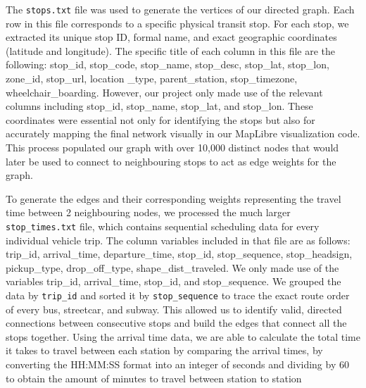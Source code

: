 \documentclass[fontsize=11pt]{article}
\begin{document}
\vspace{1em}

The \texttt{stops.txt} file was used to generate the vertices of our directed graph. Each row in this file corresponds to a specific physical transit stop. For each stop, we extracted its unique stop ID, formal name, and exact geographic coordinates (latitude and longitude). The specific title of each column in this file are the following: stop\_id, stop\_code, stop\_name, stop\_desc, stop\_lat, stop\_lon, zone\_id, stop\_url, location \_type, parent\_station, stop\_timezone, wheelchair\_boarding. However, our project only made use of the relevant columns including stop\_id, stop\_name, stop\_lat, and stop\_lon. These coordinates were essential not only for identifying the stops but also for accurately mapping the final network visually in our MapLibre visualization code. This process populated our graph with over 10,000 distinct nodes that would later be used to connect to neighbouring stops to act as edge weights for the graph. 

\vspace{1em}

To generate the edges and their corresponding weights representing the travel time between 2 neighbouring nodes, we processed the much larger \texttt{stop\_times.txt} file, which contains sequential scheduling data for every individual vehicle trip. The column variables included in that file are as follows: trip\_id, arrival\_time, departure\_time, stop\_id, stop\_sequence, stop\_headsign, pickup\_type, drop\_off\_type, shape\_dist\_traveled. We only made use of the variables trip\_id, arrival\_time, stop\_id, and stop\_sequence. We grouped the data by \texttt{trip\_id} and sorted it by \texttt{stop\_sequence} to trace the exact route order of every bus, streetcar, and subway. This allowed us to identify valid, directed connections between consecutive stops and build the edges that connect all the stops together. Using the arrival time data, we are able to calculate the total time it takes to travel between each station by comparing the arrival times, by converting the HH:MM:SS format into an integer of seconds and dividing by 60 to obtain the amount of minutes to travel between station to station

\vspace{1em}
\end{document}
